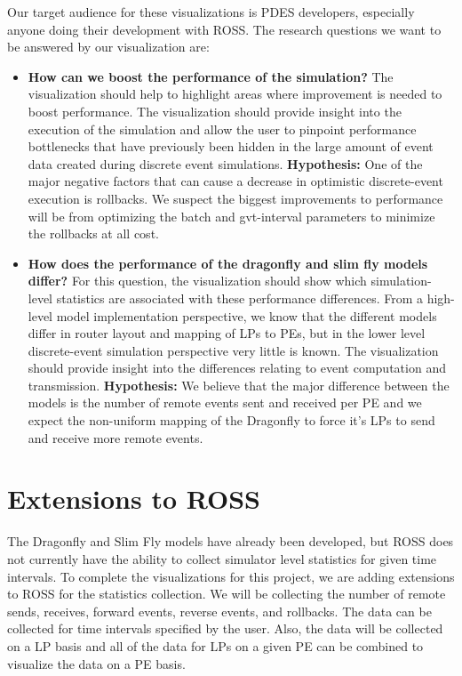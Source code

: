 \documentclass{acm_proc_article-sp}
\begin{document}
Our target audience for these visualizations is PDES developers, especially anyone doing their development with ROSS.  The research questions we want to be answered by our visualization are:
\begin{itemize}
\item \textbf{How can we boost the performance of the simulation?} The visualization should help to highlight areas where improvement is needed to boost performance. The visualization should provide insight into the execution of the simulation and allow the user to pinpoint performance bottlenecks that have previously been hidden in the large amount of event data created during discrete event simulations. \textbf{Hypothesis:} One of the major negative factors that can cause a decrease in optimistic discrete-event execution is rollbacks. We suspect the biggest improvements to performance will be from optimizing the batch and gvt-interval parameters to minimize the rollbacks at all cost.
\item  \textbf{How does the performance of the dragonfly and slim fly models differ?}  For this question, the visualization should show which simulation-level statistics are associated with these performance differences. From a high-level model implementation perspective, we know that the different models differ in router layout and mapping of LPs to PEs, but in the lower level discrete-event simulation perspective very little is known. The visualization should provide insight into the differences relating to event computation and transmission. \textbf{Hypothesis:} We believe that the major difference between the models is the number of remote events sent and received per PE and we expect the non-uniform mapping of the Dragonfly to force it's LPs to send and receive more remote events.
\end{itemize}


\section{Extensions to ROSS}
The Dragonfly and Slim Fly models have already been developed, but ROSS does not currently have the ability to collect simulator level statistics for given time intervals.  To complete the visualizations for this project, we are adding extensions to ROSS for the statistics collection.  We will be collecting the number of remote sends, receives,  forward events, reverse events, and rollbacks.  The data can be collected for time intervals specified by the user.  Also, the data will be collected on a LP basis and all of the data for LPs on a given PE can be combined to visualize the data on a PE basis.  
\end{document}
